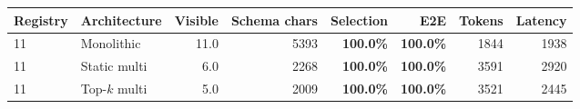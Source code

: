 \begin{tabular}{llrrrrrr}
\toprule
Registry & Architecture & Visible & Schema chars & Selection & E2E & Tokens & Latency \\
\midrule
11 & Monolithic & 11.0 & 5393 & \textbf{100.0\%} & \textbf{100.0\%} & 1844 & 1938 \\
11 & Static multi & 6.0 & 2268 & \textbf{100.0\%} & \textbf{100.0\%} & 3591 & 2920 \\
11 & Top-$k$ multi & 5.0 & 2009 & \textbf{100.0\%} & \textbf{100.0\%} & 3521 & 2445 \\
\bottomrule
\end{tabular}
